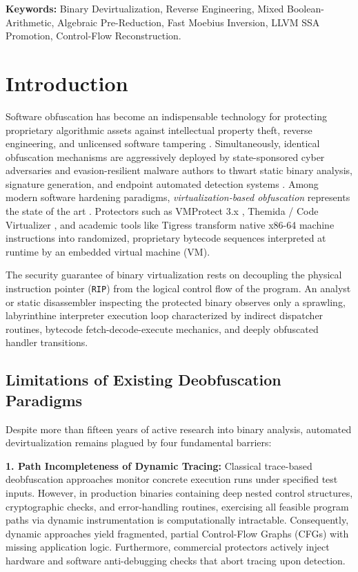 \documentclass[11pt,a4paper]{article}
\begin{document}
\vspace{0.3cm}
\noindent\textbf{Keywords:} Binary Devirtualization, Reverse Engineering, Mixed Boolean-Arithmetic, Algebraic Pre-Reduction, Fast Moebius Inversion, LLVM SSA Promotion, Control-Flow Reconstruction.

\section{Introduction}
Software obfuscation has become an indispensable technology for protecting proprietary algorithmic assets against intellectual property theft, reverse engineering, and unlicensed software tampering \cite{collberg2002}. Simultaneously, identical obfuscation mechanisms are aggressively deployed by state-sponsored cyber adversaries and evasion-resilient malware authors to thwart static binary analysis, signature generation, and endpoint automated detection systems \cite{christodorescu2005}. Among modern software hardening paradigms, \textit{virtualization-based obfuscation} represents the state of the art \cite{x64unpack, rolles2009, yadegari2015, coogan2011}. Protectors such as VMProtect 3.x \cite{x64unpack, vmprotect}, Themida / Code Virtualizer \cite{themida}, and academic tools like Tigress \cite{tigress} transform native x86-64 machine instructions into randomized, proprietary bytecode sequences interpreted at runtime by an embedded virtual machine (VM).

The security guarantee of binary virtualization rests on decoupling the physical instruction pointer (\texttt{RIP}) from the logical control flow of the program. An analyst or static disassembler inspecting the protected binary observes only a sprawling, labyrinthine interpreter execution loop characterized by indirect dispatcher routines, bytecode fetch-decode-execute mechanics, and deeply obfuscated handler transitions.

\subsection{Limitations of Existing Deobfuscation Paradigms}
Despite more than fifteen years of active research into binary analysis, automated devirtualization remains plagued by four fundamental barriers:

\textbf{1. Path Incompleteness of Dynamic Tracing:} Classical trace-based deobfuscation approaches \cite{yadegari2015, sharif2009, coogan2011} monitor concrete execution runs under specified test inputs. However, in production binaries containing deep nested control structures, cryptographic checks, and error-handling routines, exercising all feasible program paths via dynamic instrumentation is computationally intractable. Consequently, dynamic approaches yield fragmented, partial Control-Flow Graphs (CFGs) with missing application logic. Furthermore, commercial protectors actively inject hardware and software anti-debugging checks \cite{x64unpack} that abort tracing upon detection.
\end{document}
